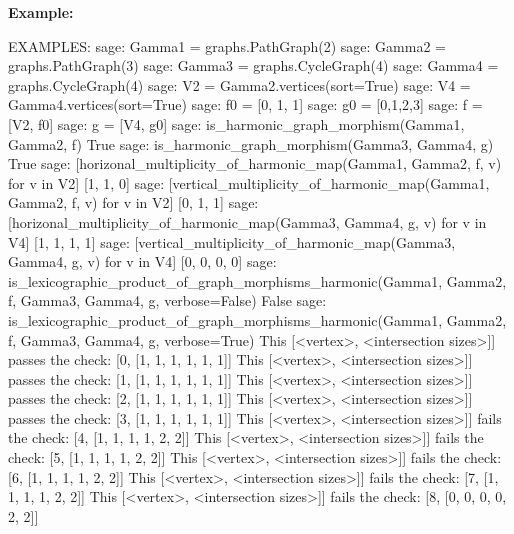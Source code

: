 \documentclass{article}
\begin{document}
\noindent
\textbf{Example:}
{\small{
\begin{spverbatim}
EXAMPLES:
    sage: Gamma1 = graphs.PathGraph(2)                                                       
    sage: Gamma2 = graphs.PathGraph(3)                                                       
    sage: Gamma3 = graphs.CycleGraph(4)                                                      
    sage: Gamma4 = graphs.CycleGraph(4)                                                      
    sage: V2 = Gamma2.vertices(sort=True)                                                   
    sage: V4 = Gamma4.vertices(sort=True)                                                 
    sage: f0 = [0, 1, 1]                                                            
    sage: g0 = [0,1,2,3]                                                            
    sage: f = [V2, f0]                                                              
    sage: g = [V4, g0]                                                                
    sage: is_harmonic_graph_morphism(Gamma1, Gamma2, f)                                 
    True
    sage: is_harmonic_graph_morphism(Gamma3, Gamma4, g)                                
    True
    sage: [horizonal_multiplicity_of_harmonic_map(Gamma1, Gamma2, f, v) for v in V2]       
    [1, 1, 0]
    sage: [vertical_multiplicity_of_harmonic_map(Gamma1, Gamma2, f, v) for v in V2]         
    [0, 1, 1]
    sage: [horizonal_multiplicity_of_harmonic_map(Gamma3, Gamma4, g, v) for v in V4]       
    [1, 1, 1, 1]
    sage: [vertical_multiplicity_of_harmonic_map(Gamma3, Gamma4, g, v) for v in V4]       
    [0, 0, 0, 0]
    sage: is_lexicographic_product_of_graph_morphisms_harmonic(Gamma1, Gamma2, f, Gamma3, Gamma4, g, verbose=False)  
    False
    sage: is_lexicographic_product_of_graph_morphisms_harmonic(Gamma1, Gamma2, f, Gamma3, Gamma4, g, verbose=True)   
    This [<vertex>, <intersection sizes>]] passes the check: [0, [1, 1, 1, 1, 1, 1]]
    This [<vertex>, <intersection sizes>]] passes the check: [1, [1, 1, 1, 1, 1, 1]]
    This [<vertex>, <intersection sizes>]] passes the check: [2, [1, 1, 1, 1, 1, 1]]
    This [<vertex>, <intersection sizes>]] passes the check: [3, [1, 1, 1, 1, 1, 1]]
    This [<vertex>, <intersection sizes>]] fails the check: [4, [1, 1, 1, 1, 2, 2]]
    This [<vertex>, <intersection sizes>]] fails the check: [5, [1, 1, 1, 1, 2, 2]]
    This [<vertex>, <intersection sizes>]] fails the check: [6, [1, 1, 1, 1, 2, 2]]
    This [<vertex>, <intersection sizes>]] fails the check: [7, [1, 1, 1, 1, 2, 2]]
    This [<vertex>, <intersection sizes>]] fails the check: [8, [0, 0, 0, 0, 2, 2]]

\end{spverbatim}}}
\end{document}
